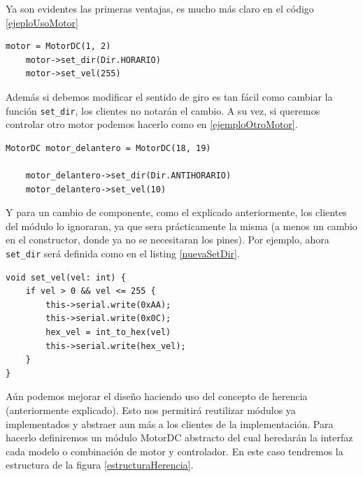 Ya son evidentes las primeras ventajas, es mucho más claro en el código \ref{ejeploUsoMotor}

\begin{lstlisting}[caption=Ejmplo de uso de la interfaz del módulo MotorDC, label={ejeploUsoMotor}]
	motor = MotorDC(1, 2)
    motor->set_dir(Dir.HORARIO)
    motor->set_vel(255)
\end{lstlisting}

Además si debemos modificar el sentido de giro es tan fácil como cambiar la función \verb|set_dir|, los clientes no notarán el cambio. A su vez, si queremos controlar otro motor podemos hacerlo como en \ref{ejemploOtroMotor}. 

\begin{lstlisting}[caption=Ejemplo control nuevo motor,label={ejemploOtroMotor}]
    MotorDC motor_delantero = MotorDC(18, 19)

    motor_delantero->set_dir(Dir.ANTIHORARIO)
    motor_delantero->set_vel(10)
\end{lstlisting}

Y para un cambio de componente, como el explicado anteriormente, los clientes del módulo lo ignoraran, ya que sera prácticamente la misma (a menos un cambio en el constructor, donde ya no se necesitaran los pines). Por ejemplo, ahora \verb|set_dir| será definida como en el listing \ref{nuevaSetDir}.

\begin{lstlisting}[caption=Nueva definición set\_dir,label={nuevaSetDir}]
void set_vel(vel: int) {
    if vel > 0 && vel <= 255 {
        this->serial.write(0xAA);
        this->serial.write(0x0C);
        hex_vel = int_to_hex(vel)
        this->serial.write(hex_vel);
    }
}
\end{lstlisting}

Aún podemos mejorar el diseño haciendo uso del concepto de herencia (anteriormente explicado). Esto nos permitirá reutilizar módulos ya implementados y abstraer aun más a los clientes de la implementación. Para hacerlo definiremos un módulo MotorDC abstracto del cual heredarán la interfaz cada modelo o combinación de motor y controlador. En este caso tendremos la estructura de la figura \ref{estructuraHerencia}.


